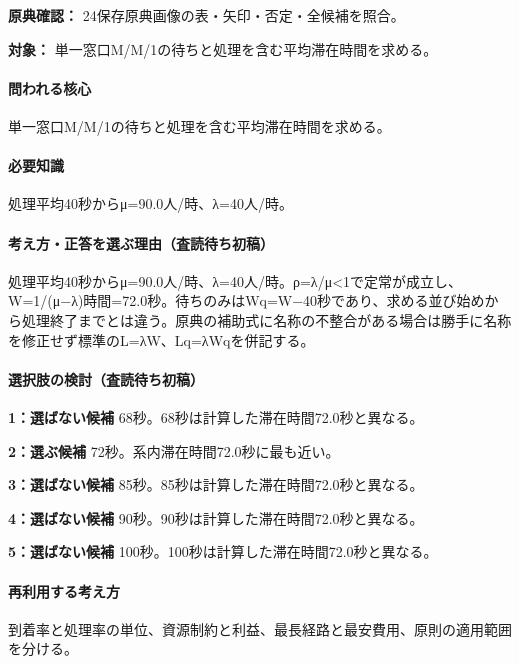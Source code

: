 \noindent\textbf{原典確認：} 24保存原典画像の表・矢印・否定・全候補を照合。\par

\noindent\textbf{対象：} 単一窓口M/M/1の待ちと処理を含む平均滞在時間を求める。\par

\paragraph{問われる核心} 単一窓口M/M/1の待ちと処理を含む平均滞在時間を求める。

\paragraph{必要知識} 処理平均40秒からμ=90.0人/時、λ=40人/時。

\paragraph{考え方・正答を選ぶ理由（査読待ち初稿）} 処理平均40秒からμ=90.0人/時、λ=40人/時。ρ=λ/μ<1で定常が成立し、W=\allowbreak{}1/(μ−λ)時間=72.0秒。待ちのみはWq=\allowbreak{}W−40秒であり、求める並び始めから処理終了までとは違う。原典の補助式に名称の不整合がある場合は勝手に名称を修正せず標準のL=λW、Lq=λWqを併記する。

\paragraph{選択肢の検討（査読待ち初稿）}\mbox{}\par

\noindent\textbf{1：選ばない候補} 68秒。68秒は計算した滞在時間72.0秒と異なる。\par

\noindent\textbf{2：選ぶ候補} 72秒。系内滞在時間72.0秒に最も近い。\par

\noindent\textbf{3：選ばない候補} 85秒。85秒は計算した滞在時間72.0秒と異なる。\par

\noindent\textbf{4：選ばない候補} 90秒。90秒は計算した滞在時間72.0秒と異なる。\par

\noindent\textbf{5：選ばない候補} 100秒。100秒は計算した滞在時間72.0秒と異なる。\par

\paragraph{再利用する考え方} 到着率と処理率の単位、資源制約と利益、最長経路と最安費用、原則の適用範囲を分ける。

